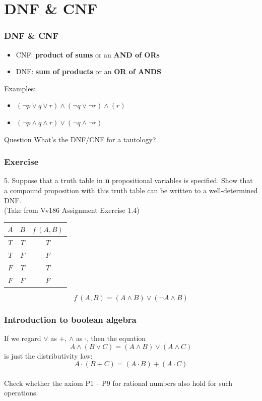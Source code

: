 \documentclass[xcolor=table]{beamer}
\begin{document}
\section{DNF \& CNF}
\begin{frame}
    \frametitle{DNF \& CNF}
    \begin{itemize}
        \item  CNF: \textbf{product of sums} or an \textbf{AND of ORs}
        \item  DNF: \textbf{sum of products} or an \textbf{OR of ANDS}
    \end{itemize}
    \textcolor[rgb]{0.95,0.75,0.95}{Examples:}
    \begin{itemize}
        \item $(\neg p \vee  q \vee r) \wedge (\neg q \vee \neg r) \wedge (r)$
        \item $(\neg p \wedge q \wedge r) \vee (\neg q \wedge \neg r) $        
    \end{itemize}
    \begin{block}{Question}
        What's the DNF/CNF for a tautology?
    \end{block}
\end{frame}
\begin{frame}
    \frametitle{Exercise}
    5. Suppose that a truth table in \textbf{n} propositional variables 
    is speciﬁed. Show that a compound proposition with 
    this truth table can be written to a well-determined DNF. \\(Take from Vv186 Assignment Exercise 1.4)
    \begin{table}[H]
        \begin{tabular}{ccc}
        $A$& $B$ &$f~(A,B)$  \\
        \toprule
        $T$ &$T$  & $T$ \\
        $T$ &$F$  & $F$ \\
        $F$ &$T$  & $T$ \\
        $F$ &$F$  & $F$ \\
        \bottomrule
        \end{tabular}
    \end{table}
    \vv
    $$f~(A,B)=(A \wedge B) \vee (\neg A \wedge B)$$
\end{frame}
\begin{frame}
    \frametitle{Introduction to boolean algebra}
    \vv
    If we regard $\vee$ as $+$, $\wedge$ as $\cdot$, then the equation 
        $$A\wedge(B\vee C)=(A\wedge B)\vee(A\wedge C)$$
    is just the distributivity law:
        $$A \cdot (B+C) = (A\cdot B) + (A \cdot C)$$
    \vv
    \textbf{\textit{}}\\
    Check whether the axiom P1 -- P9 for rational numbers also hold for such operations.
\end{frame}
\end{document}
